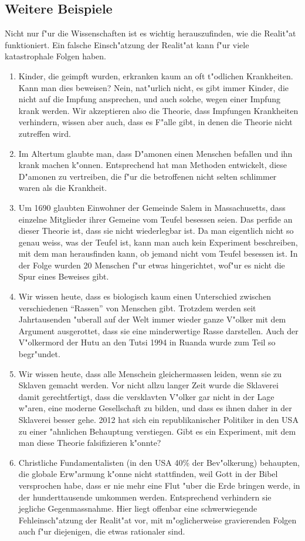 \subsection*{Weitere Beispiele}
Nicht nur f"ur die Wissenschaften ist es wichtig herauszufinden,
wie die Realit"at funktioniert.
Ein falsche Einsch"atzung der Realit"at kann f"ur viele katastrophale
Folgen haben.
\begin{enumerate}
\item Kinder, die geimpft wurden, erkranken kaum an oft t"odlichen
Krankheiten. Kann man dies beweisen? Nein, nat"urlich nicht, es gibt
immer Kinder, die nicht auf die Impfung ansprechen, und auch solche,
wegen einer Impfung krank werden. Wir akzeptieren also die Theorie,
dass Impfungen Krankheiten verhindern, wissen aber auch, dass es
F"alle gibt, in denen die Theorie nicht zutreffen wird.
\item Im Altertum glaubte man, dass D"amonen einen Menschen
befallen und ihn krank machen k"onnen. Entsprechend hat man Methoden
entwickelt, diese D"amonen zu vertreiben, die f"ur die betroffenen
nicht selten schlimmer waren als die Krankheit.
\item Um 1690 glaubten Einwohner der Gemeinde Salem in Massachusetts,
dass einzelne Mitglieder ihrer Gemeine vom Teufel besessen seien.
Das perfide an dieser Theorie ist, dass sie nicht wiederlegbar ist.
Da man eigentlich nicht so genau weiss, was der Teufel ist, kann man
auch kein Experiment beschreiben, mit dem man herausfinden kann, ob
jemand nicht vom Teufel besessen ist. In der Folge wurden 20 Menschen
f"ur etwas hingerichtet, wof"ur es nicht die Spur eines Beweises gibt.
\item Wir wissen heute, dass es biologisch kaum einen Unterschied
zwischen verschiedenen ``Rassen'' von Menschen gibt.
Trotzdem werden seit Jahrtausenden "uberall auf der Welt immer wieder
ganze V"olker mit dem Argument ausgerottet, dass sie eine minderwertige
Rasse darstellen. Auch der V"olkermord der Hutu an den Tutsi 1994 in Ruanda
wurde zum Teil so begr"undet.
\item Wir wissen heute, dass alle Menschein gleichermassen leiden,
wenn sie zu Sklaven gemacht werden.
Vor nicht allzu langer Zeit wurde die Sklaverei damit gerechtfertigt,
dass die versklavten V"olker gar nicht in der Lage w"aren, eine moderne
Gesellschaft zu bilden, und dass es ihnen daher in der Sklaverei besser
gehe. 2012 hat sich ein republikanischer Politiker in den USA
zu einer "ahnlichen Behauptung verstiegen. Gibt es ein Experiment, mit dem
man diese Theorie falsifizieren k"onnte?
\item Christliche Fundamentalisten (in den USA 40\% der Bev"olkerung)
behaupten, die globale Erw"armung k"onne
nicht stattfinden, weil Gott in der Bibel versprochen habe, dass er
nie mehr eine Flut "uber die Erde bringen werde, in der hunderttausende
umkommen werden.
Entsprechend verhindern sie jegliche Gegenmassnahme.
Hier liegt offenbar eine schwerwiegende Fehleinsch"atzung der
Realit"at vor, mit m"oglicherweise gravierenden Folgen auch f"ur
diejenigen, die etwas rationaler sind.
\end{enumerate}


